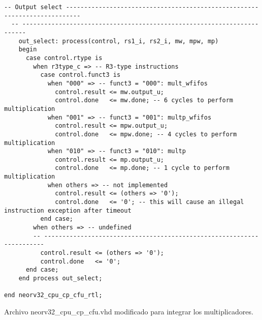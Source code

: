 \begin{code}
\begin{verbatim}
-- Output select --------------------------------------------------------------------------
  -- -----------------------------------------------------------------------
    out_select: process(control, rs1_i, rs2_i, mw, mpw, mp)
    begin
      case control.rtype is
        when r3type_c => -- R3-type instructions
          case control.funct3 is
            when "000" => -- funct3 = "000": mult_wfifos
              control.result <= mw.output_u;
              control.done   <= mw.done; -- 6 cycles to perform multiplication
            when "001" => -- funct3 = "001": multp_wfifos
              control.result <= mpw.output_u;
              control.done   <= mpw.done; -- 4 cycles to perform multiplication
            when "010" => -- funct3 = "010": multp
              control.result <= mp.output_u;
              control.done   <= mp.done; -- 1 cycle to perform multiplication
            when others => -- not implemented
              control.result <= (others => '0');
              control.done   <= '0'; -- this will cause an illegal instruction exception after timeout
          end case;
        when others => -- undefined
        -- ----------------------------------------------------------------------
          control.result <= (others => '0');
          control.done   <= '0';
      end case;
    end process out_select;

end neorv32_cpu_cp_cfu_rtl;
\end{verbatim}
\caption{Archivo neorv32\_cpu\_cp\_cfu.vhd modificado para integrar los multiplicadores.}
\label{ap-cod:16}
\end{code}

